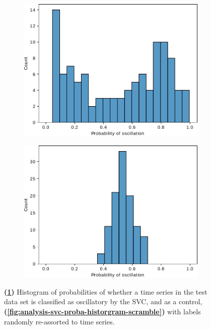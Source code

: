 \begin{figure}
  \centering
  \begin{subfigure}[htpb]{0.5\textwidth}
   \centering
   \includegraphics[width=\textwidth]{svm_2_edit.pdf}
   \caption{
   }
   \label{fig:analysis-svc-proba-historgram-model}
  \end{subfigure}%
  \begin{subfigure}[htpb]{0.5\textwidth}
   \centering
   \includegraphics[width=\textwidth]{svm_scramble_2_edit.pdf}
   \caption{
   }
   \label{fig:analysis-svc-proba-histogram-scramble}
  \end{subfigure}

  \caption{
    \textbf{(\ref{fig:analysis-svc-proba-historgram-model})}
    Histogram of probabilities of whether a time series in the test data set is classified as oscillatory by the SVC, and as a control,
    \textbf{(\ref{fig:analysis-svc-proba-historgram-scramble})}
    with labels randomly re-assorted to time series.
  }
  \label{fig:analysis-svc-proba-histogram}
\end{figure}


